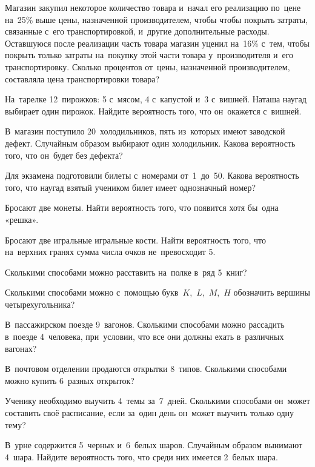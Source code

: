  Магазин закупил некоторое количество товара и~начал его реализацию по~цене на~25\% выше цены, назначенной производителем, чтобы чтобы покрыть затраты, связанные с~его транспортировкой, и~другие дополнительные расходы. Оставшуюся после реализации часть товара магазин уценил на~16\% с~тем, чтобы покрыть только затраты на~покупку этой части товара у~производителя и~его транспортировку. Сколько процентов от~цены, назначенной производителем, составляла цена транспортировки товара?

На~тарелке 12~пирожков: 5 с~мясом, 4 с~капустой и~3 с~вишней. Наташа наугад выбирает один пирожок. Найдите вероятность того, что он~окажется с~вишней.

В~магазин поступило 20~холодильников, пять из~которых имеют заводской дефект. Случайным образом выбирают один холодильник. Какова вероятность того, что он~будет без дефекта?

Для экзамена подготовили билеты с~номерами от~1~до~50. Какова вероятность того, что наугад взятый учеником билет имеет однозначный номер?

Бросают две монеты. Найти вероятность того, что появится хотя бы~одна «решка».

Бросают две игральные игральные кости. Найти вероятность того, что на~верхних гранях сумма числа очков не~превосходит 5. 

Сколькими способами можно расставить на~полке в~ряд 5~книг?

Сколькими способами можно с~помощью букв~$K$,~$L$,~$M$,~$H$ обозначить вершины четырехугольника?

В~пассажирском поезде 9~вагонов. Сколькими способами можно рассадить в~поезде 4~человека, при~условии, что все они должны ехать в~различных вагонах?

В~почтовом отделении продаются открытки 8~типов. Сколькими способами можно купить 6~разных открыток? 

Ученику необходимо выучить 4~темы за~7~дней. Сколькими способами он~может составить своё расписание, если за~один день он~может выучить только одну тему? 

В~урне содержится 5~черных и~6~белых шаров. Случайным образом вынимают 4~шара. Найдите вероятность того, что среди них имеется 2~белых шара. 

